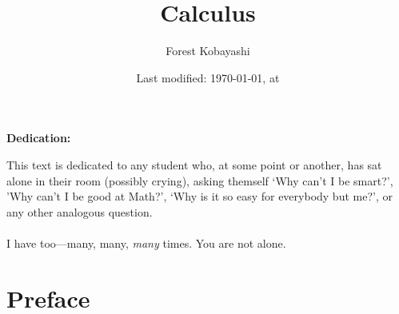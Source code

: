 \documentclass[10pt]{article}
\theoremstyle{definition}
\begin{document}
\pagestyle{fancy}

\setlength{\headheight}{0pt}
\setlength\parindent{0pt}


\setlength{\headheight}{0pt}
\pretitle{\begin{center}\Huge\bfseries}
\posttitle{\par\end{center}\vskip 0.5em}
\preauthor{\begin{center}\Large\ttfamily}
\postauthor{\end{center}}
\predate{\par\large\centering}
\postdate{\par}

\title{Calculus}
\author{Forest Kobayashi}
\date{Last modified: \today, at \the\time}
\maketitle
\thispagestyle{empty}
\clearpage
\vspace{5cm}
\begin{center}
\Large\bfseries Dedication:
\end{center}
{\large%
This text is dedicated to any student who, at some point or another, has sat alone in their room (possibly crying), asking themself `Why can't I be smart?', 'Why can't I be good at Math?', `Why is it so easy for everybody but me?', or any other analogous question.  \\~\\I have too---many, many, \emph{many} times.  You are not alone. }%
\thispagestyle{empty}
\clearpage
\tableofcontents
\clearpage
\pagestyle{fancy}
\section{Preface}
\end{document}
